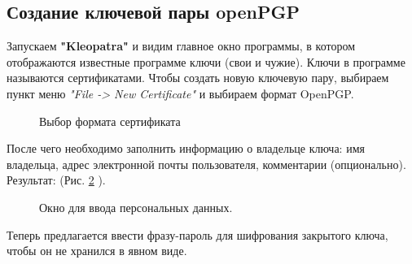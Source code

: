 \documentclass[10pt,a4paper]{report}
\begin{document}
\subsection{Создание ключевой пары openPGP}
Запускаем \textbf{"Kleopatra"} и видим главное окно программы, в котором отображаются известные программе ключи (свои и чужие). Ключи в программе называются сертификатами. Чтобы создать новую ключевую пару, выбираем пункт меню \textit{"File -> New Certificate"} и выбираем формат OpenPGP. 
\begin{figure}[ht]	
\caption{Выбор формата сертификата}\label{ris:image0}
\end{figure} 
После чего необходимо заполнить информацию о владельце ключа: имя владельца, адрес электронной почты пользователя, комментарии (опционально). Результат: (Рис. \ref{ris:image1} ).
\begin{figure}[ht]	
\caption{Окно для ввода персональных данных.}\label{ris:image1}
\end{figure}
Теперь предлагается ввести фразу-пароль для шифрования закрытого ключа, чтобы он не хранился в явном виде.
\end{document}
